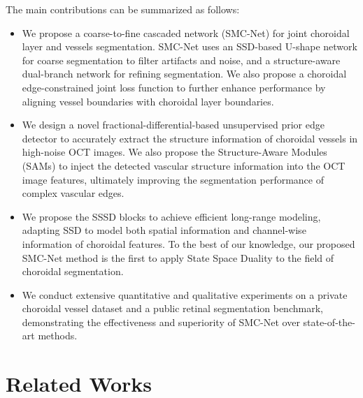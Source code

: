 \documentclass[lettersize,journal]{IEEEtran}
\begin{document}
The main contributions can be summarized as follows:
\begin{itemize}
    \item We propose a coarse-to-fine cascaded network (SMC-Net) for joint choroidal layer and vessels segmentation. SMC-Net uses an SSD-based U-shape network for coarse segmentation to filter artifacts and noise, and a structure-aware dual-branch network for refining segmentation. We also propose a choroidal edge-constrained joint loss function to further enhance performance by aligning vessel boundaries with choroidal layer boundaries.
    \item We design a novel fractional-differential-based unsupervised prior edge detector to accurately extract the structure information of choroidal vessels in high-noise OCT images. We also propose the Structure-Aware Modules (SAMs) to inject the detected vascular structure information into the OCT image features, ultimately improving the segmentation performance of complex vascular edges.
    \item We propose the SSSD blocks to achieve efficient long-range modeling, adapting SSD to model both spatial information and channel-wise information of choroidal features. To the best of our knowledge, our proposed SMC-Net method is the first to apply State Space Duality to the field of choroidal segmentation.
    \item We conduct extensive quantitative and qualitative experiments on a private choroidal vessel dataset and a public retinal segmentation benchmark, demonstrating the effectiveness and superiority of SMC-Net over state-of-the-art methods.
\end{itemize}

\section{Related Works}
\end{document}
